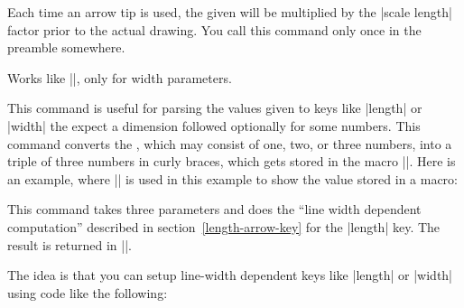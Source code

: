 \begin{command}{\pgfarrowsaddtolengthscalelist{}}
    Each time an arrow tip is used, the given  will be
    multiplied by the |scale length| factor prior to the actual drawing. You
    call this command only once in the preamble somewhere.
\end{command}

\begin{command}{\pgfarrowsaddtowidthscalelist{}}
    Works like |\pgfarrowsaddtolengthscalelist|, only for width parameters.
\end{command}


\begin{command}{\pgfarrowsthreeparameters{}}
    This command is useful for parsing the values given to keys like |length|
    or |width| the expect a dimension followed optionally for some numbers.
    This command converts the ,
    which may consist of one, two, or three numbers, into a triple of three
    numbers in curly braces, which gets stored in the macro
    |\pgfarrowstheparameters|. Here is an example, where |\showvalueofmacro| is
    used in this example to show the value stored in a macro:
\begin{codeexample}
    \makeatletter
    \def\showvalueofmacro#1{%
        \texttt{\expandafter\expandafter\expandafter\expandafter\expandafter\expandafter\expandafter\pgfutil@gobble\expandafter\expandafter\expandafter\string\expandafter\csname#1\endcsname}
    }%
\end{codeexample}
%
\begin{codeexample}[]
\showvalueofmacro\pgfarrowstheparameters
\end{codeexample}
\end{command}

\begin{command}{\pgfarrowslinewidthdependent{}}
    This command takes three parameters and does the ``line width dependent
    computation'' described in section~\ref{length-arrow-key} for the |length|
    key. The result is returned in |\pgf@x|.

    The idea is that you can setup line-width dependent keys like |length| or
    |width| using code like the following:
\begin{codeexample}[code only]
\pgfkeys{/pgf/arrow keys/depth/.code={%
  \pgfarrowsthreeparameters{#1}%
  \expandafter\pgfarrowsaddtolateoptions\expandafter{%
    \expandafter\pgfarrowslinewidthdependent\pgfarrowstheparameters%
    \pgfarrowdepth\pgf@x%
  }%
}
\end{codeexample}
\end{command}

